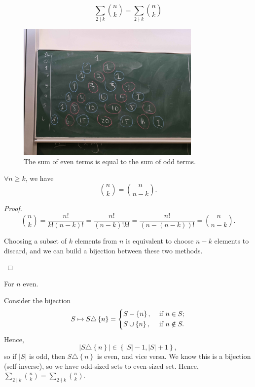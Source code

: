 \begin{corollary}
    \[
        \sum_{2 \mid k} \binom{n}{k} = \sum_{2 \nmid k} \binom{n}{k}  
    \]
\end{corollary}
\begin{figure}[H]
    \centering
    \includegraphics[width=0.8\textwidth]{./Figures/20250909_161713.jpg}
    \caption{The sum of even terms is equal to the sum of odd terms.}
    \label{fig:binomial term even odd relation}
\end{figure}

\begin{theorem}
    \(\forall n \ge k\), we have 
    \[
        \binom{n}{k} = \binom{n}{n-k}.
    \] 
\end{theorem}
\begin{proof}
    \[
        \binom{n}{k}=\frac{n!}{k!(n-k)!} = \frac{n!}{(n-k)!k!} = \frac{n!}{(n - (n-k))!}=\binom{n}{n-k}.
    \]
    \begin{remark}
        Choosing a subset of \(k\) elements from \(n\) is equivalent to choose \(n-k\) elements to discard, and we can build a bijection between these two methods.    
    \end{remark}
\end{proof}

For \(n\) even. 

Consider the bijection 
\[
    S \mapsto S \triangle \left\{ n \right\} = \begin{dcases}
       S - \left\{ n \right\}  , &\text{ if } n \in S  ;\\
       S \cup \left\{ n \right\}  , &\text{ if } n \notin S.
    \end{dcases} 
\]
Hence, 
\[
    \vert S \triangle \left\{ n \right\}  \vert \in \left\{ \vert S \vert - 1, \vert S \vert + 1   \right\},   
\] so if \(\vert S \vert \) is odd, then \(S \triangle \left\{ n \right\} \) is even, and vice versa. We know this is a bijection (self-inverse), so we have odd-sized sets to even-sized set. Hence, \(\sum_{2 \mid k} \binom{n}{k} = \sum_{2 \nmid k} \binom{n}{k}  \). 

